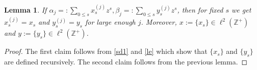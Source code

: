 \documentclass[10pt,a4paper]{amsart}
\newtheorem{lemma}{Lemma}
\newcommand{\Z}{\mathbb Z}
\def\le{\leqslant}
\begin{document}
\begin{lemma}\label{suv} If $\alpha_j=:\sum_{0\le s}x_s^{(j)}z^s, \beta_j=:\sum_{0\le s}y_s^{(j)}z^s$, then for fixed $s$ we get $x_s^{(j)}=x_s$ and $y_s^{(j)}=y_s$ for large enough $j$. Moreover, $x:=\{x_s\}\in \ell^2(\Z^+)$ and $y:=\{y_s\}\in \ell^2(\Z^+)$.
\end{lemma}

\begin{proof}The first claim follows from   \eqref{sd1} and \eqref{le} which show that $\{x_s\}$ and $\{y_s\}$ are defined recursively. The second  claim follows  from the previous lemma.
\end{proof}
\end{document}
